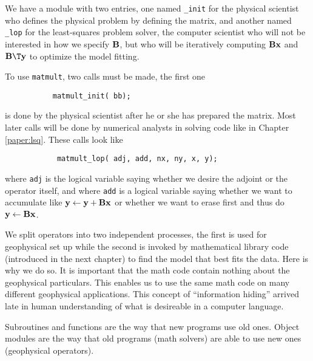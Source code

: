 We have a module with two entries,
one named {\tt \_init} 
for the physical scientist who defines the physical problem by
defining the matrix, and
another named {\tt \_lop} 
for the least-squares problem solver,
the computer scientist who will not be interested
in how we specify $\bold B$, but who will be iteratively computing
$\bold B\bold x$ and $\bold B\T \bold y$
to optimize the model fitting.
\begin{comment}
The lines beginning with {\tt {\#}{\%}} are expanded by Loptran into
more verbose and distracting Fortran 90 code.
The second line in the module \texttt{matmult},
however,
is pure Fortran syntax saying that
{\tt bb} is a pointer to a real-valued matrix.
\end{comment}
\par
To use \texttt{matmult}, two calls must be made,
the first one
\begin{verbatim}
           matmult_init( bb);
\end{verbatim}
is done by the physical scientist after he or she has prepared the matrix.
Most later calls will be done by numerical analysts
in solving code like in Chapter \ref{paper:lsq}.
These calls look like
\begin{verbatim}
            matmult_lop( adj, add, nx, ny, x, y);
\end{verbatim}
where {\tt adj} is the logical variable saying whether we desire
the adjoint or the operator itself,
and where {\tt add} is a logical variable saying
whether we want to accumulate like
$\bold y \leftarrow \bold y+\bold B\bold x$
or whether we want to erase first and thus do
$\bold y \leftarrow \bold B\bold x$.
\begin{comment}
The return value {\tt stat} is an integer parameter,
mostly useless (unless you want to use it for error codes). 
\par
Operator initialization often allocates memory.
To release this memory, you can {\tt call matmult\_close()}
although in this case nothing really happens.
\end{comment}
\par
We split operators into two independent processes,
the first is used for geophysical set up
while the second is invoked by mathematical library code
(introduced in the next chapter)
to find the model that best fits the data.
Here is why we do so.
It is important that the math code contain nothing about
the geophysical particulars.  This enables us to use
the same math code on many different geophysical applications.
This concept of ``information hiding'' arrived late in
human understanding of what is desireable in a computer language.
\begin{comment}
This feature alone is valuable enough to warrant
upgrading from Fortran 77 to Fortran 90, and likewise from C to C++.
\end{comment}
Subroutines and functions are the way that new programs use old ones.
Object modules are the way that old programs (math solvers)
are able to use new ones (geophysical operators).


